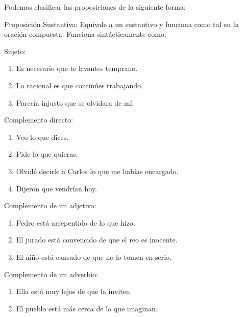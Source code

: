 Podemos clasificar las proposiciones de la siguiente forma:

\begin{lista}

\item Proposición Sustantiva: Equivale a un sustantivo y funciona
como tal en la oración compuesta. Funciona sintácticamente como:

\begin{ejems}{}Sujeto: 
\begin{enumerate}
\item Es necesario \textsf{que te levantes temprano}. 
\item Lo racional es \textsf{que continúes trabajando}. 
\item Parecía injusto \textsf{que se olvidara de mí}.
\end{enumerate}
\end{ejems}

\begin{ejems}{}Complemento directo: 
\begin{enumerate}
\item Veo\textsf{ lo que dices}. 
\item Pide \textsf{lo que quieras}.
\item Olvidé decirle a Carlos \textsf{lo que me habías encargado}. 
\item Dijeron \textsf{que vendrían hoy}.
\end{enumerate}
\end{ejems}

\begin{ejems}{}Complemento de un adjetivo: 
\begin{enumerate}
\item Pedro está arrepentido \textsf{de lo que hizo}. 
\item El jurado está convencido \textsf{de que el reo es inocente}. 
\item El niño está cansado \textsf{de que no lo tomen en serio}.
\end{enumerate}
\end{ejems}

\begin{ejems}{}Complemento de un adverbio:
\begin{enumerate}
\item Ella está muy lejos \textsf{de que la inviten}. 
\item El pueblo está más cerca \textsf{de lo que imaginan}.
\end{enumerate}
\end{ejems}


\end{lista}
